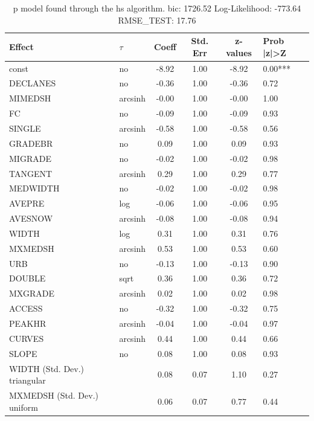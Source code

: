 \begin{table}
	\caption{p model found through the hs algorithm. bic: 1726.52 Log-Likelihood: -773.64 RMSE_TEST: 17.76}
	\begin{center}
		\begin{tabular}{|l|l|c|c|c|l|}
			\hline
			Effect & $\tau$ & Coeff & Std. Err & z-values & Prob |z|>Z \\
			\hline
			const & no & -8.92 & 1.00 & -8.92 & 0.00*** \\
			\hline
			DECLANES & no & -0.36 & 1.00 & -0.36 & 0.72 \\
			\hline
			MIMEDSH & arcsinh & -0.00 & 1.00 & -0.00 & 1.00 \\
			\hline
			FC & no & -0.09 & 1.00 & -0.09 & 0.93 \\
			\hline
			SINGLE & arcsinh & -0.58 & 1.00 & -0.58 & 0.56 \\
			\hline
			GRADEBR & no & 0.09 & 1.00 & 0.09 & 0.93 \\
			\hline
			MIGRADE & no & -0.02 & 1.00 & -0.02 & 0.98 \\
			\hline
			TANGENT & arcsinh & 0.29 & 1.00 & 0.29 & 0.77 \\
			\hline
			MEDWIDTH & no & -0.02 & 1.00 & -0.02 & 0.98 \\
			\hline
			AVEPRE & log & -0.06 & 1.00 & -0.06 & 0.95 \\
			\hline
			AVESNOW & arcsinh & -0.08 & 1.00 & -0.08 & 0.94 \\
			\hline
			WIDTH & log & 0.31 & 1.00 & 0.31 & 0.76 \\
			\hline
			MXMEDSH & arcsinh & 0.53 & 1.00 & 0.53 & 0.60 \\
			\hline
			URB & no & -0.13 & 1.00 & -0.13 & 0.90 \\
			\hline
			DOUBLE & sqrt & 0.36 & 1.00 & 0.36 & 0.72 \\
			\hline
			MXGRADE & arcsinh & 0.02 & 1.00 & 0.02 & 0.98 \\
			\hline
			ACCESS & no & -0.32 & 1.00 & -0.32 & 0.75 \\
			\hline
			PEAKHR & arcsinh & -0.04 & 1.00 & -0.04 & 0.97 \\
			\hline
			CURVES & arcsinh & 0.44 & 1.00 & 0.44 & 0.66 \\
			\hline
			SLOPE & no & 0.08 & 1.00 & 0.08 & 0.93 \\
			\hline
			WIDTH (Std. Dev.) triangular &  & 0.08 & 0.07 & 1.10 & 0.27 \\
			\hline
			MXMEDSH (Std. Dev.) uniform &  & 0.06 & 0.07 & 0.77 & 0.44 \\

\end{tabular}
\end{center}
\end{table}
